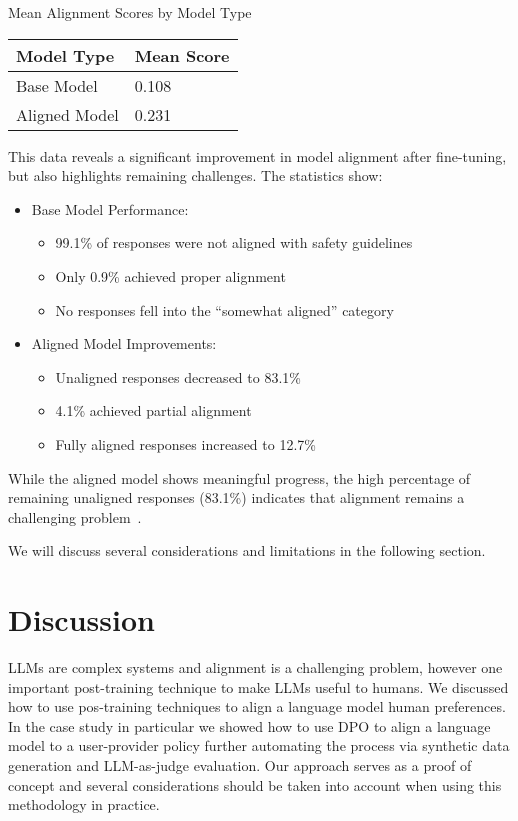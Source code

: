 \begin{margintable}
\caption{Mean Alignment Scores by Model Type}
\begin{tabular}{ll}
\toprule
Model Type & Mean Score \\
\midrule
Base Model & 0.108 \\
Aligned Model & 0.231 \\
\bottomrule
\end{tabular}
\end{margintable}



This data reveals a significant improvement in model alignment after fine-tuning, but also highlights remaining challenges. The statistics show:
\begin{itemize}
\item Base Model Performance:
  \begin{itemize}
  \item 99.1\% of responses were not aligned with safety guidelines
  \item Only 0.9\% achieved proper alignment
  \item No responses fell into the ``somewhat aligned'' category
  \end{itemize}
\item Aligned Model Improvements:
  \begin{itemize}
  \item Unaligned responses decreased to 83.1\%
  \item 4.1\% achieved partial alignment
  \item Fully aligned responses increased to 12.7\%
  \end{itemize}
\end{itemize}

While the aligned model shows meaningful progress, the high percentage of remaining unaligned responses (83.1\%) indicates that alignment remains a challenging problem~.

We will discuss several considerations and limitations in the following section.

\section{Discussion}

LLMs are complex systems and alignment is a challenging problem, however one important post-training technique to make LLMs useful to humans. We discussed how to use pos-training techniques to align a language model human preferences. In the case study in particular we showed how to use DPO to align a language model to a user-provider policy further automating the process via synthetic data generation and LLM-as-judge evaluation. Our approach serves as a proof of concept and several considerations should be taken into account when using this methodology in practice.

